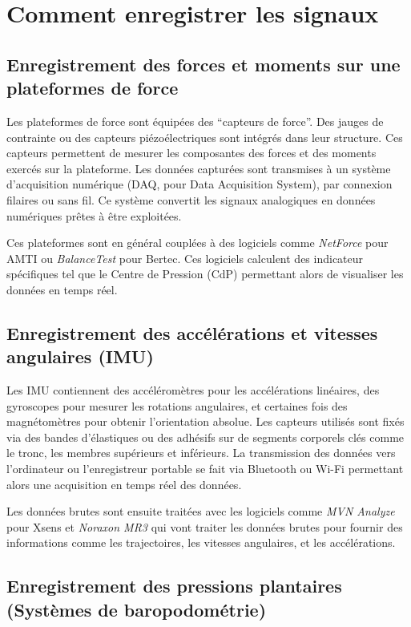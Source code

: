 \section{Comment enregistrer les signaux}

\subsection{Enregistrement des forces et moments sur une plateformes de force}

Les plateformes de force sont équipées des “capteurs de force”. 
Des jauges de contrainte ou des capteurs piézoélectriques sont intégrés dans leur structure.
Ces capteurs permettent de mesurer les composantes des forces et des moments exercés sur la plateforme.
Les données capturées sont transmises à un système d’acquisition numérique (DAQ, pour Data Acquisition System), par connexion filaires ou sans fil.
Ce système convertit les signaux analogiques en données numériques prêtes à être exploitées.

Ces plateformes sont en général couplées à des logiciels comme \textit{NetForce} pour AMTI ou \textit{BalanceTest} pour Bertec. 
Ces logiciels calculent des indicateur spécifiques tel que le Centre de Pression (CdP) permettant alors de visualiser les données en temps réel.

\subsection{Enregistrement des accélérations et vitesses angulaires (IMU)}

Les IMU contiennent des accéléromètres pour les accélérations linéaires, des gyroscopes pour mesurer les rotations angulaires, et certaines fois des magnétomètres pour obtenir l’orientation absolue.
Les capteurs utilisés sont fixés via des bandes d’élastiques ou des adhésifs sur de segments corporels clés comme le tronc, les membres supérieurs et inférieurs.
La transmission des données vers l’ordinateur ou l’enregistreur portable se fait via Bluetooth ou Wi-Fi permettant alors une acquisition en temps réel des données.

Les données brutes sont ensuite traitées avec les logiciels comme \textit{MVN Analyze} pour Xsens et \textit{Noraxon MR3} qui vont traiter les données brutes pour fournir des informations comme les trajectoires, les vitesses angulaires, et les accélérations.

\subsection{Enregistrement des pressions plantaires (Systèmes de baropodométrie)}

